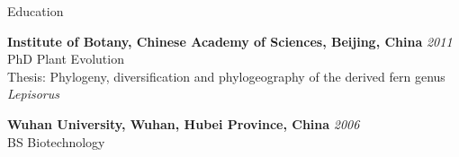 \documentclass{resume} %
\begin{document}

\begin{rSection}{Education}

{\bf Institute of Botany, Chinese Academy of Sciences, Beijing, China} \hfill {\em 2011} 
\\ PhD Plant Evolution 
\\Thesis: Phylogeny, diversification and phylogeography of the derived fern genus \emph{Lepisorus}

{\bf Wuhan University, Wuhan, Hubei Province, China} \hfill {\em 2006} 
\\ BS Biotechnology 




\end{rSection}


\end{document}
